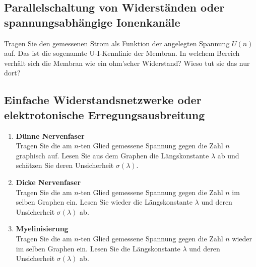\subsection{Parallelschaltung von Widerständen oder spannungsabhängige Ionenkanäle}

Tragen Sie den gemessenen Strom als Funktion der angelegten Spannung $U(n)$ auf. Das ist die sogenannte U-I-Kennlinie der Membran. In welchem Bereich verhält sich die Membran wie ein ohm'scher Widerstand? Wieso tut sie das nur dort?

\subsection{Einfache Widerstandsnetzwerke oder elektrotonische Erregungsausbreitung}

\begin{enumerate}
	\item \textbf{Dünne Nervenfaser}\\
	Tragen Sie die am $n$-ten Glied gemessene Spannung gegen die Zahl $n$ graphisch auf. Lesen Sie aus dem Graphen die Längskonstante $\lambda$ ab und schätzen Sie deren Unsicherheit $\sigma(\lambda)$.
	\item \textbf{Dicke Nervenfaser}\\
	Tragen Sie die am $n$-ten Glied gemessene Spannung gegen die Zahl $n$ im selben Graphen ein. Lesen Sie wieder die Längskonstante $\lambda$ und deren Unsicherheit $\sigma(\lambda)$ ab.
	\item \textbf{Myelinisierung}\\
	Tragen Sie die am $n$-ten Glied gemessene Spannung gegen die Zahl $n$ wieder im selben Graphen ein. Lesen Sie die Längskonstante $\lambda$ und deren Unsicherheit $\sigma(\lambda)$ ab.
\end{enumerate}